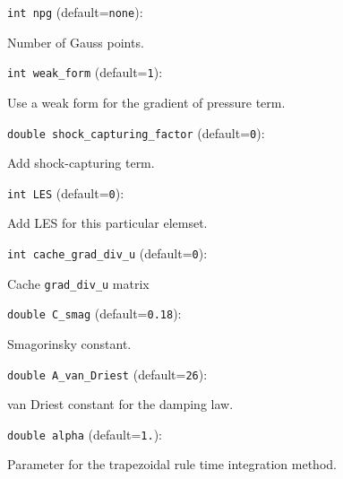 \item\verb+int npg+ {\rm(default=\verb|none|)}:

Number of Gauss points.

\item\verb+int weak_form+ {\rm(default=\verb|1|)}:

Use a weak form for the gradient of pressure term.

\item\verb+double shock_capturing_factor+ {\rm(default=\verb|0|)}:

Add shock-capturing term.

\item\verb+int LES+ {\rm(default=\verb|0|)}:

Add LES for this particular elemset.

\item\verb+int cache_grad_div_u+ {\rm(default=\verb|0|)}:

Cache \verb+grad_div_u+ matrix

\item\verb+double C_smag+ {\rm(default=\verb|0.18|)}:

Smagorinsky constant.

\item\verb+double A_van_Driest+ {\rm(default=\verb|26|)}:

van Driest constant for the damping law.

\item\verb+double alpha+ {\rm(default=\verb|1.|)}:

Parameter for the trapezoidal rule time integration method. 

